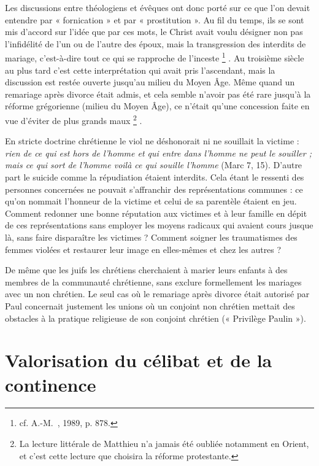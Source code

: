  Les discussions entre théologiens et évêques ont donc porté sur ce que l'on devait entendre par « fornication » et par « prostitution ». Au fil du temps, ils se sont mis d'accord sur l'idée que par ces mots, le Christ avait voulu désigner non pas l'infidélité de l'un ou de l'autre des époux, mais la transgression des interdits de mariage, c'est-à-dire tout ce qui se rapproche de l'inceste%
\footnote{cf. A.-M.~, 1989, p. 878.}%
. Au troisième siècle au plus tard c'est cette interprétation qui avait pris l'ascendant, mais la discussion est restée ouverte jusqu'au milieu du Moyen Âge. Même quand un remariage après divorce était admis, et cela semble n'avoir pas été rare jusqu'à la réforme grégorienne (milieu du Moyen Âge), ce n'était qu'une concession faite en vue d'éviter de plus grands maux%
\footnote{La lecture littérale de Matthieu n'a jamais été oubliée notamment en Orient, et c'est cette lecture que choisira la réforme protestante.}%
.

 En stricte doctrine chrétienne le viol ne déshonorait ni ne souillait la victime : \emph{rien de ce qui est hors de l'homme et qui entre dans l'homme ne peut le souiller ; mais ce qui sort de l'homme voilà ce qui souille l'homme} (Marc 7, 15). D'autre part le suicide comme la répudiation étaient interdits. Cela étant le ressenti des personnes concernées ne pouvait s'affranchir des représentations communes : ce qu'on nommait l'honneur de la victime et celui de sa parentèle étaient en jeu. Comment redonner une bonne réputation aux victimes et à leur famille en dépit de ces représentations sans employer les moyens radicaux qui avaient cours jusque là, sans faire disparaître les victimes ? Comment soigner les traumatismes des femmes violées et restaurer leur image en elles-mêmes et chez les autres ?  

 De même que les juifs les chrétiens cherchaient à marier leurs enfants à des membres de la communauté chrétienne, sans exclure formellement les mariages avec un non chrétien. Le seul cas où le remariage après divorce était autorisé par Paul concernait justement les unions où un conjoint non chrétien mettait des obstacles à la pratique religieuse de son conjoint chrétien (« Privilège Paulin »).


\section{Valorisation du célibat et de la continence}

